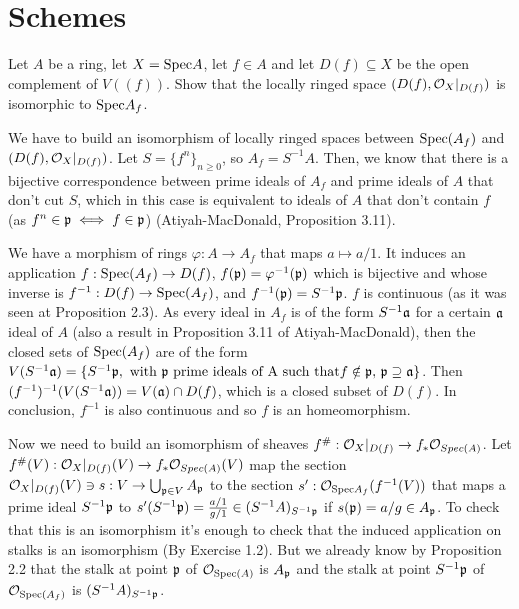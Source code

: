 \section{Schemes}

\begin{ex}
	Let $A$ be a ring, let $X = \mathrm{Spec} A$, let $f \in A$ and let $D(f) \subseteq X$ be the open complement of $V((f))$. Show that the locally ringed space $(D(f), \mathcal{O}_X|_{D(f)})$ is isomorphic to $\mathrm{Spec} A_f$.
\end{ex}

\begin{sol}
	We have to build an isomorphism of locally ringed spaces between $\mathrm{Spec}(A_f)$ and $(D(f), \mathcal{O}_X|_{D(f)})$. Let $S = \{f^n\}_{n \geq 0}$, so $A_f = S^{-1}A$. Then, we know that there is a bijective correspondence between prime ideals of $A_f$ and prime ideals of $A$ that don't cut $S$, which in this case is equivalent to ideals of $A$ that don't contain $f$ (as $f^n \in \mathfrak{p} \iff f \in \mathfrak{p}$) (Atiyah-MacDonald, Proposition 3.11).

	We have a morphism of rings $\varphi: A \to A_{f}$ that maps $a \mapsto a/1$. It induces an application $f: \mathrm{Spec} (A_f) \to D(f)$, $f(\mathfrak{p}) =  \varphi^{-1}(\mathfrak{p})$ which is bijective and whose inverse is $f^{-1}: D(f) \to \mathrm{Spec}(A_f)$, and $f^{-1}(\mathfrak{p}) = S^{-1}\mathfrak{p}$. $f$ is continuous (as it was seen at Proposition 2.3). As every ideal in $A_f$ is of the form $S^{-1}\mathfrak{a}$ for a certain $\mathfrak{a}$ ideal of $A$ (also a result in Proposition 3.11 of Atiyah-MacDonald), then the closed sets of $\mathrm{Spec}(A_f)$ are of the form $V(S^{-1}\mathfrak{a}) = \{S^{-1}\mathfrak{p}, \text{ with } \mathfrak{p} \text{ prime ideals of A such that} f \notin \mathfrak{p}, \, \mathfrak{p} \supseteq \mathfrak{a}\}$. Then $(f^{-1})^{-1}(V(S^{-1}\mathfrak{a})) = V(\mathfrak{a}) \cap D(f)$, which is a closed subset of $D(f)$. In conclusion, $f^{-1}$ is also continuous and so $f$ is an homeomorphism.

	Now we need to build an isomorphism of sheaves $f^{\#}: \mathcal{O}_X|_{D(f)} \to f_* \mathcal{O}_{Spec(A)}$. Let $f^{\#}(V): \mathcal{O}_X|_{D(f)}(V) \to f_* \mathcal{O}_{Spec(A)}(V)$ map the section $\mathcal{O}_X|_{D(f)}(V) \ni s : V \to \bigcup_{\mathfrak{p} \in V} A_{\mathfrak{p}}$ to the section $s': \mathcal{O}_{\mathrm{Spec}{A_f}}(f^{-1}(V))$ that maps a prime ideal $S^{-1}\mathfrak{p}$ to $s'(S^{-1}\mathfrak{p}) = \frac{a/1}{g/1} \in (S^{-1}A)_{S^{-1}\mathfrak{p}}$ if $s(\mathfrak{p}) = a/g \in A_{\mathfrak{p}}$. To check that this is an isomorphism it's enough to check that the induced application on stalks is an isomorphism (By Exercise 1.2). But we already know by Proposition 2.2 that the stalk at point $\mathfrak{p}$ of $\mathcal{O}_{\mathrm{Spec}(A)}$ is $A_{\mathfrak{p}}$ and the stalk at point $S^{-1}\mathfrak{p}$ of $\mathcal{O}_{\mathrm{Spec}(A_f)}$ is $(S^{-1}A)_{S^{-1}\mathfrak{p}}$. 


\end{sol}
